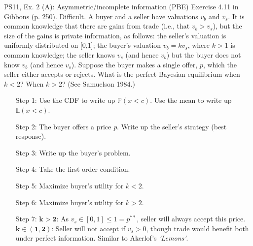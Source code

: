 \begin{frame}{PS11, Ex. 2 (A): Asymmetric/incomplete information (PBE)}
    Exercise 4.11 in Gibbons (p. 250). Difficult. A buyer and a seller have valuations $v_b$ and $v_s$. It is common knowledge that there are gains from trade (i.e., that $v_b > v_s$), but the size of the gains is private information, as follows: the seller’s valuation is uniformly distributed on [0,1]; the buyer’s valuation $v_b = kv_s$, where $k > 1$ is common knowledge; the seller knows $v_s$ (and hence $v_b$) but the buyer does not know $v_b$ (and hence $v_s$). Suppose the buyer makes a single offer, $p$, which the seller either accepts or rejects. What is the perfect Bayesian equilibrium when $k < 2$? When $k > 2$? (See Samuelson 1984.) \vspace{-8pt}
    \begin{multicols}{2}
      \begin{itemize}
        \item[Step 1:] Use the CDF to write up $\mathbb{P}(x<c)$. Use the mean to write up $\mathbb{E}(x<c)$.
        \item[Step 2:] The buyer offers a price \textit{p}. Write up the seller's strategy (best response).
        \item[Step 3:] Write up the buyer's problem.
        \item[Step 4:] Take the first-order condition.
        \item[Step 5:] Maximize buyer's utility for $k<2$.
        \item[Step 6:] Maximize buyer's utility for $k>2$.
        \item[Step 7:] $\bm{k>2}$: As $v_s\in[0,1]\leq1=p^{**}$, seller will always accept this price.\\
        $\bm{k\in(1,2)}$: Seller will not accept if $v_s>0$, though trade would benefit both under perfect information. Similar to Akerlof's \textit{'Lemons'}.
      \end{itemize}
      \vfill\null\columnbreak
\end{multicols}
\end{frame}
